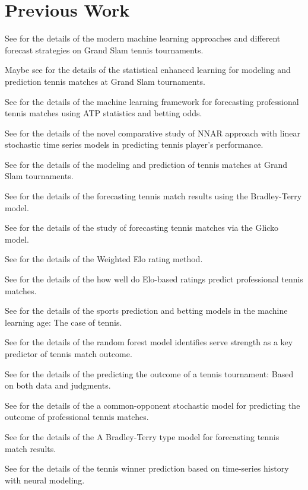 \documentclass[11pt, oneside]{article}
\begin{document}
\section{Previous Work}

See \cite{buhamra_2025-2} for the details of the modern machine learning approaches and different forecast strategies on Grand Slam tennis tournaments.

Maybe see \cite{buhamra_2025-1} for the details of the statistical enhanced learning for modeling and prediction tennis matches at Grand Slam tournaments.

See \cite{trucco_2025} for the details of the machine learning framework for forecasting professional tennis matches using ATP statistics and betting odds.

See \cite{almarashi_2024} for the details of the novel comparative study of NNAR approach with linear stochastic time series models in predicting tennis player's performance.

See \cite{buhamra_2024} for the details of the modeling and prediction of tennis matches at Grand Slam tournaments.

See \cite{fayomi_2022} for the details of the forecasting tennis match results using the Bradley-Terry model.

See \cite{yue_2022} for the details of the study of forecasting tennis matches via the Glicko model.

See \cite{angelini_2022} for the details of the Weighted Elo rating method.

See \cite{williams_2021} for the details of the how well do Elo-based ratings predict professional tennis matches.

See \cite{wilkens_2021} for the details of the sports prediction and betting models in the machine learning age: The case of tennis.

See \cite{gao_2021} for the details of the random forest model identifies serve strength as a key predictor of tennis match outcome.

See \cite{gu_2019} for the details of the predicting the outcome of a tennis tournament: Based on both data and judgments.

See \cite{knottenbelt_2012} for the details of the a common-opponent stochastic model for predicting the outcome of professional tennis matches.

See \cite{mchale_2011} for the details of the A Bradley-Terry type model for forecasting tennis match results.

See \cite{somboonphokkaphan_2009} for the details of the tennis winner prediction based on time-series history with neural modeling.

\printbibliography
\end{document}
